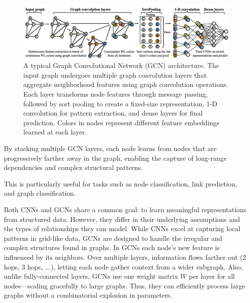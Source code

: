 \documentclass{article}
\begin{document}
\begin{figure}[h]
      \centering
      \includegraphics[width=1.0\textwidth]{../assets/gcn_architecture.png}
      \caption{A typical Graph Convolutional Network (GCN) architecture. The input graph undergoes multiple graph convolution layers that aggregate neighborhood features using graph convolution operations. Each layer transforms node features through message passing, followed by sort pooling to create a fixed-size representation, 1-D convolution for pattern extraction, and dense layers for final prediction. Colors in nodes represent different feature embeddings learned at each layer.}
      \label{fig:gcn-architecture}
\end{figure}

By stacking multiple GCN layers, each node learns from nodes that are progressively farther away in the graph, enabling the capture of long-range dependencies and complex structural patterns.

This is particularly useful for tasks such as node classification, link prediction, and graph classification.

Both CNNs and GCNs share a common goal: to learn meaningful representations from structured data.
However, they differ in their underlying assumptions and the types of relationships they can model.
While CNNs excel at capturing local patterns in grid-like data, GCNs are designed to handle the irregular and complex structures found in graphs.
In GCNs each node's new feature is influenced by its neighbors. Over multiple layers, information flows farther out (2 hops, 3 hops, $\dots$), letting each node gather context from a wider subgraph.
Also, unlike fully-connected layers, GCNs use one weight matrix $W$ per layer for all nodes—scaling gracefully to large graphs. Thus, they can efficiently process large graphs without a combinatorial explosion in parameters.




\end{document}
